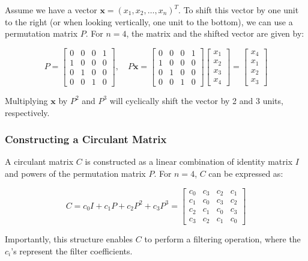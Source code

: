 Assume we have a vector \( \mathbf{x} = (x_1, x_2, \ldots, x_n)^T \). To shift this vector by one unit to the right (or when looking vertically, one unit to the bottom), we can use a permutation matrix \( P \). For \( n = 4 \), the matrix and the shifted vector are given by:

\[
P = \begin{bmatrix}
0 & 0 & 0 & 1 \\
1 & 0 & 0 & 0 \\
0 & 1 & 0 & 0 \\
0 & 0 & 1 & 0
\end{bmatrix}, \quad
P\mathbf{x} = \begin{bmatrix}
0 & 0 & 0 & 1 \\
1 & 0 & 0 & 0 \\
0 & 1 & 0 & 0 \\
0 & 0 & 1 & 0
\end{bmatrix}  \begin{bmatrix}
x_1 \\
x_2 \\
x_3 \\
x_4
\end{bmatrix} =\begin{bmatrix}
x_4 \\
x_1 \\
x_2 \\
x_3
\end{bmatrix}
\]

Multiplying \( \mathbf{x} \) by \( P^2 \) and \( P^3 \) will cyclically shift the vector by 2 and 3 units, respectively.

\subsubsection*{Constructing a Circulant Matrix}

A circulant matrix \( C \) is constructed as a linear combination of identity matrix \( I \) and powers of the permutation matrix \( P \). For \( n = 4 \), \( C \) can be expressed as:

\[
C = c_0I + c_1P + c_2P^2 + c_3P^3 = \begin{bmatrix}
c_0 & c_3 & c_2 & c_1 \\
c_1 & c_0 & c_3 & c_2 \\
c_2 & c_1 & c_0 & c_3 \\
c_3 & c_2 & c_1 & c_0
\end{bmatrix}
\]

Importantly, this structure enables \( C \) to perform a filtering operation, where the \( c_i \)'s represent the filter coefficients.\\

